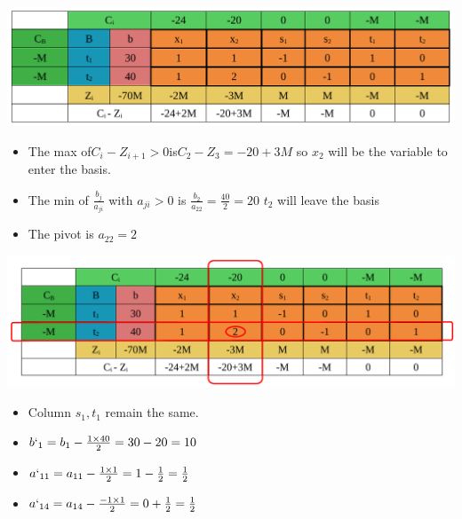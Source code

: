 \newpage

\begin{center}
    \includegraphics{Chapters/Simplexe/EX/EX3/ex3.1.pdf}
\end{center}


\vspace{0.25cm}
\begin{itemize}   
\item The max of\hspace{0.2cm}\(C_i - Z_{i+1} > 0\)\hspace{0.2cm}is\hspace{0.2cm}\(C_2 - Z_3 = -20+3M\)\hspace{0.1cm} so \(x_2\) 
will be the variable to enter the basis.
\item The min of \hspace{0.1cm}\(\frac{b_j}{a_{ji}}\)\hspace{0.1cm} with \(a_{ji} > 0\)\hspace{0.1cm} is \hspace{0.1cm} \(\frac{b_2}{a_{22}} = \frac{40}{2} = 20\)\hspace{0.35cm} \(t_2\)
will leave the basis
\item The pivot is \(a_{22} = 2\)
 
\end{itemize}


\vspace{0.25cm}

\begin{center}
    \includegraphics{Chapters/Simplexe/EX/EX3/ex3.2.pdf}
\end{center}

\vspace{0.25cm}
\begin{itemize}
 \item Column \(s_1 , t_1\) remain the same.
 \item \(b`_{1} = b_{1} - \frac{1\times40}{2} = 30 - 20  = 10\)
 \item \(a`_{11} = a_{11} - \frac{1\times1}{2} = 1 - \frac{1}{2}  = \frac{1}{2}\)
 \item \(a`_{14} = a_{14} - \frac{-1\times1}{2} = 0 + \frac{1}{2}  = \frac{1}{2}\)
\end{itemize}

